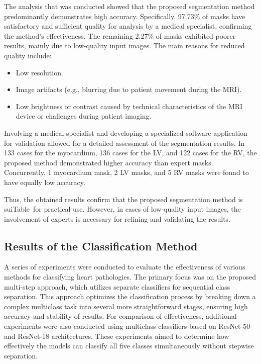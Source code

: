 \documentclass[fleqn,10pt]{wlscirep}
\begin{document}
The analysis that was conducted showed that the proposed segmentation method predominantly demonstrates high accuracy. Specifically, 97.73\% of masks have satisfactory and sufficient quality for analysis by a medical specialist, confirming the method's effectiveness. The remaining 2.27\% of masks exhibited poorer results, mainly due to low-quality input images. The main reasons for reduced quality include:

\begin{itemize}
    \item Low resolution.
    \item Image artifacts (e.g., blurring due to patient movement during the MRI).
    \item Low brightness or contrast caused by technical characteristics of the MRI device or challenges during patient imaging.
\end{itemize}

Involving a medical specialist and developing a specialized software application for validation allowed for a detailed assessment of the segmentation results. In 133 cases for the myocardium, 136 cases for the LV, and 122 cases for the RV, the proposed method demonstrated higher accuracy than expert masks. Concurrently, 1 myocardium mask, 2 LV masks, and 5 RV masks were found to have equally low accuracy.

Thus, the obtained results confirm that the proposed segmentation method is suiTable~for practical use. However, in cases of low-quality input images, the involvement of experts is necessary for refining and validating the results.

\subsection*{Results of the Classification Method}

A series of experiments were conducted to evaluate the effectiveness of various methods for classifying heart pathologies. The primary focus was on the proposed multi-step approach, which utilizes separate classifiers for sequential class separation. This approach optimizes the classification process by breaking down a complex multiclass task into several more straightforward stages, ensuring high accuracy and stability of results. For comparison of effectiveness, additional experiments were also conducted using multiclass classifiers based on ResNet-50 and ResNet-18 architectures. These experiments aimed to determine how effectively the models can classify all five classes simultaneously without stepwise separation.
\end{document}
